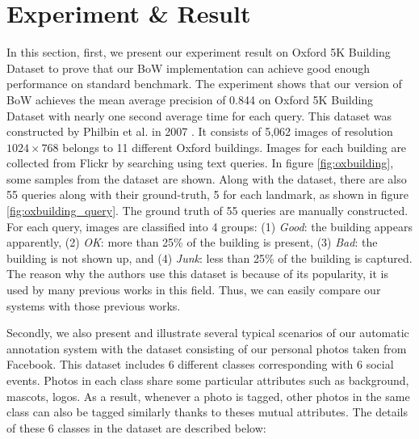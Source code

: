 \section{Experiment \& Result} \label{section:experiment_result}

In this section, first, we present our experiment result on Oxford 5K Building Dataset to prove that our BoW implementation can achieve good enough performance on standard benchmark. The experiment shows that our version of BoW achieves the mean average precision of 0.844 on Oxford 5K Building Dataset with nearly one second average time for each query. This dataset was constructed by Philbin et al. in 2007 \cite{2}. It consists of 5,062 images of resolution $1024 \times 768$ belongs to 11 different Oxford buildings. Images for each building are collected from Flickr by searching using text queries. In figure \ref{fig:oxbuilding}, some samples from the dataset are shown. Along with the dataset, there are also 55 queries along with their ground-truth, 5 for each landmark, as shown in figure \ref{fig:oxbuilding_query}. The ground truth of 55 queries are manually constructed. For each query, images are classified into 4 groups: (1) \textit{Good}: the building appears apparently, (2) \textit{OK}: more than 25\% of the building is present, (3) \textit{Bad}: the building is not shown up, and (4) \textit{Junk}: less than 25\% of the building is captured. The reason why the authors use this dataset is because of its popularity, it is used by many previous works in this field. Thus, we can easily compare our systems with those previous works.

Secondly, we also present and illustrate several typical scenarios of our automatic annotation system with the dataset consisting of our personal photos taken from Facebook. This dataset includes 6 different classes corresponding with 6 social events. Photos in each class share some particular attributes such as background, mascots, logos. As a result, whenever a photo is tagged, other photos in the same class can also be tagged similarly thanks to theses mutual attributes. The details of these 6 classes in the dataset are described below:

